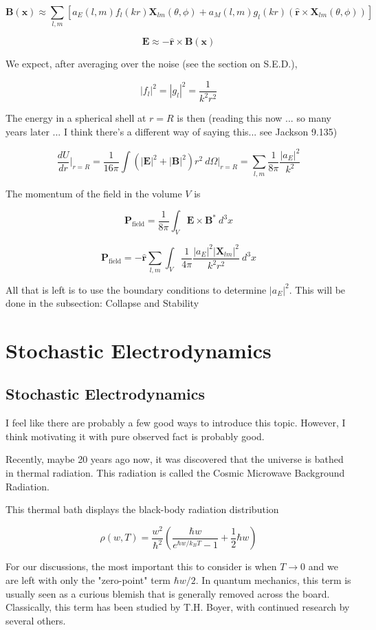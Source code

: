 \documentclass {article}
\renewcommand\vec{\mathbf}
\let\OldHat\hat
\renewcommand{\hat}[1]{\OldHat{\mathbf{#1}}}
\begin{document}
$$\vec B (\vec x) \approx \sum_{l,m} \left[ a_E (l,m) f_l (kr) \vec X_{lm} (\theta, \phi) + a_M (l, m) g_l (kr) \left( \hat r \times \vec X_{lm} (\theta, \phi)  \right) \right]$$

$$ \vec E \approx - \hat r \times \vec B(\vec x) $$

We expect, after averaging over the noise (see the section on S.E.D.), 

$$|f_l|^2 = |g_l|^2 =  \frac 1 {k^2 r^2}$$

The energy in a spherical shell at $r =R$ is then (reading this now ... so many years later ... I think there's a different way of saying this... see Jackson 9.135)

$$\frac {dU} {dr} \bigg|_{r=R} = \frac 1 {16 \pi} \int \left( |\vec E  |^2 + |\vec B |^2 \right) r^2 ~ d\Omega  \bigg|_{r=R} = \sum_{l, m} \frac 1 {8 \pi} \frac {|a_E|^2}{k^2}$$

The momentum of the field in the volume $V$ is

$$\vec P_{\text{field}} = \frac 1 {8 \pi} \int_V \vec E \times \vec B^* ~ d^3x$$ 

$$\vec P_{\text{field}} = - \hat r \sum_{l, m}   \int_V \frac 1 {4 \pi}  \frac {|a_E|^2 |\vec X_{lm} |^2}{k^2 r^2} ~ d^3x $$

All that is left is to use the boundary conditions to determine $|a_E|^2$. This will be done in the subsection: Collapse and Stability


\newpage

\section{Stochastic Electrodynamics}
\subsection{Stochastic Electrodynamics}
I feel like there are probably a few good ways to introduce this topic. However, I think motivating it with pure observed fact is probably good.

Recently, maybe 20 years ago now, it was discovered that the universe is bathed in thermal radiation. This radiation is called the Cosmic Microwave Background Radiation. 

This thermal bath displays the black-body radiation distribution

$$\rho(w, T) = \frac {w^2} {\hbar^2} \left( \frac{ \hbar w}{e^{\hbar w / k_B T} - 1} + \frac 1 2 \hbar w    \right)$$

For our discussions, the most important this to consider is when $T \rightarrow 0$ and we are left with only the "zero-point" term $\hbar w / 2$. In quantum mechanics, this term is usually seen as a curious blemish that is generally removed across the board. Classically, this term has been studied by T.H. Boyer, with continued research by several others.
\end{document}
